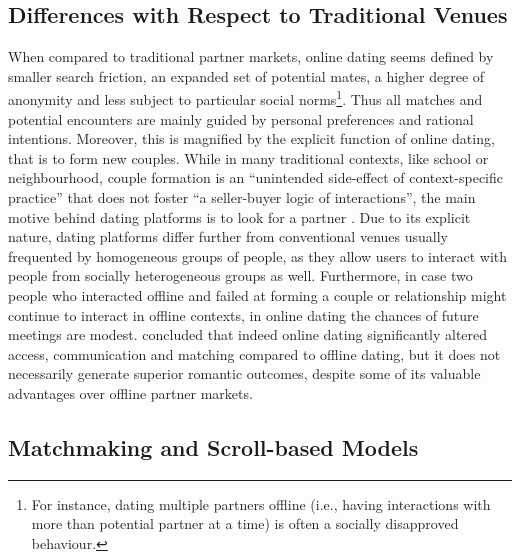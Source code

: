 \subsection{Differences with Respect to Traditional Venues}

When compared to traditional partner markets, online dating seems
defined by smaller search friction, an expanded set of potential mates,
a higher degree of anonymity and less subject to particular social
norms\footnote{For instance, dating multiple partners offline (i.e., having interactions
with more than potential partner at a time) is often a socially disapproved
behaviour. }. Thus all matches and potential encounters are mainly guided by personal
preferences and rational intentions. Moreover, this is magnified by
the explicit function of online dating, that is to form new couples.
While in many traditional contexts, like school or neighbourhood,
couple formation is an \textquotedblleft unintended side-effect of
context-specific practice\textquotedblright{} that does not foster
\textquotedblleft a seller-buyer logic of interactions\textquotedblright ,
the main motive behind dating platforms is to look for a partner \citep{Schmitz2016The-Structure-o}.
Due to its explicit nature, dating platforms differ further from conventional
venues usually frequented by homogeneous groups of people, as they
allow users to interact with people from socially heterogeneous groups
as well. Furthermore, in case two people who interacted offline and
failed at forming a couple or relationship might continue to interact
in offline contexts, in online dating the chances of future meetings
are modest. \citet{Finkel2012Online-Dating:-} concluded that indeed
online dating significantly altered access, communication and matching
compared to offline dating, but it does not necessarily generate superior
romantic outcomes, despite some of its valuable advantages over offline
partner markets. 

\subsection{Matchmaking and Scroll-based Models\label{subsec:Matchmaking-and-Scroll-based}}

